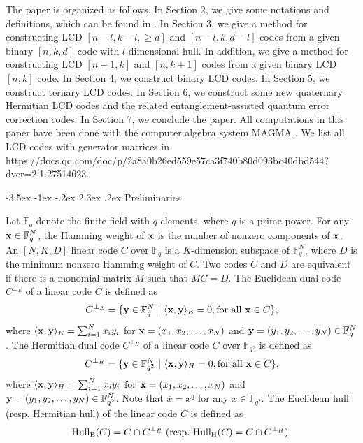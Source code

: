 \documentclass[12pt,twoside]{article}
\makeatletter
\renewcommand\section{\@startsection {section}{1}{\z@}%
                                   {-3.5ex \@plus -1ex \@minus -.2ex}%
                                   {2.3ex \@plus.2ex}%
                                   {\normalfont\large\bfseries}}
\newcommand{\F}{\mathbb{F}}
\theoremstyle{plain}
\theoremstyle{definition}
\theoremstyle{remark}
\makeatother
\begin{document}
The paper is organized as follows. In Section 2, we give some notations and definitions, which can be found in \cite{Huffman,MacWilliams}. In Section 3, we give a method for constructing LCD $[n-l,k-l,\geq d]$ and $[n-l,k,d-l]$ codes from a given binary $[n,k,d]$ code with $l$-dimensional hull. In addition, we give a method for constructing LCD $[n+1,k]$ and $[n,k+1]$ codes from a given binary LCD $[n,k]$ code. In Section 4, we construct binary LCD codes. In Section 5, we construct ternary LCD codes. In Section 6, we construct some new quaternary Hermitian LCD codes and the related
entanglement-assisted quantum error correction codes.
In Section 7, we conclude the paper.
All computations in this paper have been done with the computer algebra
system MAGMA \cite{magma}. We list all LCD codes with generator matrices in {\small https://docs.qq.com/doc/p/2a8a0b26ed559e57ca3f740b80d093bc40dbd544?dver=2.1.27514623}.

\section{Preliminaries}


Let $\F_q$ denote the finite field with $q$ elements, where $q$ is a prime power.
For any $\textbf x\in \F_q^N$, the Hamming weight of $\textbf x$ is the
number of nonzero components of $\textbf x$.
An $[N,K,D]$ linear code $C$ over $\F_q$ is a $K$-dimension subspace of $\F_q^N$, where $D$ is the minimum nonzero Hamming weight of $C$.
Two codes $C$ and $D$ are equivalent if there is a monomial matrix $M$ such
that $MC = D$.
The Euclidean dual code $C^{\perp_E}$ of a linear code $C$ is defined as
$$C^{\perp_E}=\{\textbf y\in \F_q^N~|~\langle \textbf x, \textbf y\rangle_E=0, {\rm for\ all}\ \textbf x\in C \},$$
where $\langle \textbf x, \textbf y\rangle_E=\sum_{i=1}^N x_iy_i$ for $\textbf x = (x_1,x_2, \ldots, x_N)$ and $\textbf y = (y_1,y_2, \ldots, y_N)\in \F_q^N$.
The Hermitian dual code $C^{\perp_H}$ of a linear code $C$ over $\F_{q^2}$ is defined as
$$C^{\perp_H}=\{\textbf y\in \F_{q^2}^N~|~\langle \textbf x, \textbf y\rangle_H=0, {\rm for\ all}\ \textbf x\in C \},$$
where $\langle \textbf x, \textbf y\rangle_H=\sum_{i=1}^N x_i\overline{y_i}$ for $\textbf x = (x_1,x_2, \ldots, x_N)$ and $\textbf y = (y_1,y_2, \ldots, y_N)\in \F_{q^2}^N$. Note that $\overline{x}=x^q$ for any $x\in \F_{q^2}$.
The Euclidean hull (resp. Hermitian hull) of the linear code $C$ is defined as
$${\rm Hull_E}(C)=C\cap C^{\perp_E}\ ({\rm resp.\ Hull_H}(C)=C\cap C^{\perp_H}).$$
\end{document}
